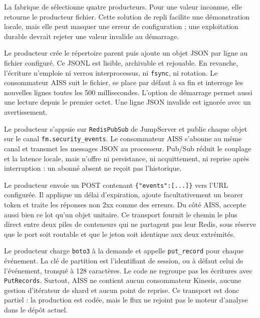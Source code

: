 \documentclass[11pt,a4paper,oneside]{report}
\theoremstyle{definition}
\theoremstyle{plain}
\begin{document}
La fabrique de  sélectionne quatre
producteurs. Pour une valeur inconnue, elle retourne le producteur fichier.
Cette solution de repli facilite une démonstration locale, mais elle peut
masquer une erreur de configuration ; une exploitation durable devrait
rejeter une valeur invalide au démarrage.

\begin{description}[leftmargin=3.2cm,style=nextline]
\item[Fichier.] Le producteur crée le répertoire parent puis ajoute un objet
JSON par ligne au fichier configuré. Ce JSONL est lisible, archivable et
rejouable. En revanche, l'écriture n'emploie ni verrou interprocessus, ni
\texttt{fsync}, ni rotation. Le consommateur AISS suit le fichier, se place
par défaut à sa fin et interroge les nouvelles lignes toutes les
500 millisecondes. L'option de démarrage permet aussi une lecture depuis le
premier octet. Une ligne JSON invalide est ignorée avec un avertissement.

\item[Redis.] Le producteur s'appuie sur \texttt{RedisPubSub} de JumpServer et
publie chaque objet sur le canal \texttt{fm.security\_events}. Le consommateur
AISS s'abonne au même canal et transmet les messages JSON au processeur.
Pub/Sub réduit le couplage et la latence locale, mais n'offre ni persistance,
ni acquittement, ni reprise après interruption : un abonné absent ne reçoit
pas l'historique.

\item[HTTP.] Le producteur envoie un POST contenant
\texttt{\{"events":[...]\}} vers l'URL configurée. Il applique un délai
d'expiration, ajoute facultativement un bearer token et traite les réponses
non 2xx comme des erreurs. Du côté AISS,  accepte aussi bien ce
lot qu'un objet unitaire. Ce transport fournit le chemin le plus direct entre
deux piles de conteneurs qui ne partagent pas leur Redis, sous réserve que le
port soit routable et que le jeton soit identique aux deux extrémités.

\item[Kinesis.] Le producteur charge \texttt{boto3} à la demande et appelle
\texttt{put\_record} pour chaque événement. La clé de partition est
l'identifiant de session, ou à défaut celui de l'événement, tronqué à
128 caractères. Le code ne regroupe pas les écritures avec
\texttt{PutRecords}. Surtout, AISS ne contient aucun consommateur Kinesis,
aucune gestion d'itérateur de shard et aucun point de reprise. Ce transport
est donc partiel : la production est codée, mais le flux ne rejoint pas le
moteur d'analyse dans le dépôt actuel.
\end{description}
\end{document}
